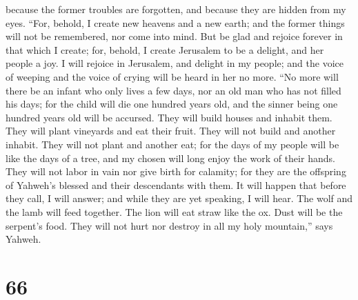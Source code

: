 because the former troubles are forgotten, and because they are hidden
from my eyes.  ``For, behold, I create new heavens and a
new earth; and the former things will not be remembered, nor come into
mind.  But be glad and rejoice forever in that which I
create; for, behold, I create Jerusalem to be a delight, and her people
a joy.  I will rejoice in Jerusalem, and delight in my
people; and the voice of weeping and the voice of crying will be heard
in her no more.  ``No more will there be an infant who only
lives a few days, nor an old man who has not filled his days; for the
child will die one hundred years old, and the sinner being one hundred
years old will be accursed.  They will build houses and
inhabit them. They will plant vineyards and eat their fruit.
 They will not build and another inhabit. They will not
plant and another eat; for the days of my people will be like the days
of a tree, and my chosen will long enjoy the work of their hands.
 They will not labor in vain nor give birth for calamity;
for they are the offspring of Yahweh's blessed and their descendants
with them.  It will happen that before they call, I will
answer; and while they are yet speaking, I will hear.  The
wolf and the lamb will feed together. The lion will eat straw like the
ox. Dust will be the serpent's food. They will not hurt nor destroy in
all my holy mountain,'' says Yahweh.

\hypertarget{section-62}{%
\section{66}\label{section-62}}

